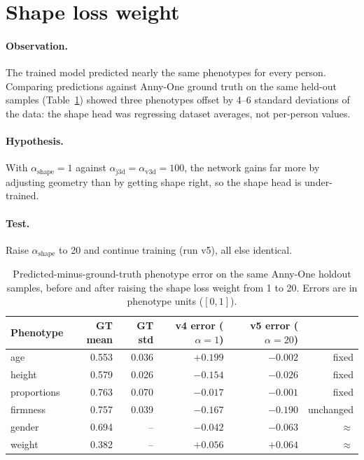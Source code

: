 \section{Shape loss weight}
\label{sec:shape_ablation}

\paragraph{Observation.} The trained model predicted nearly the same phenotypes
for every person. Comparing predictions against Anny-One ground truth on the
same held-out samples (Table~\ref{tab:shape}) showed three phenotypes offset by
4--6 standard deviations of the data: the shape head was regressing dataset
averages, not per-person values.

\paragraph{Hypothesis.} With $\alpha_{\text{shape}}{=}1$ against
$\alpha_{\text{j3d}}{=}\alpha_{\text{v3d}}{=}100$, the network gains far more by
adjusting geometry than by getting shape right, so the shape head is
under-trained.

\paragraph{Test.} Raise $\alpha_{\text{shape}}$ to 20 and continue training
(run v5), all else identical.

\begin{table}[h]
\centering\small
\begin{tabular}{lrrrrr}
\toprule
Phenotype & GT mean & GT std & v4 error ($\alpha{=}1$) & v5 error ($\alpha{=}20$) & \\
\midrule
age          & 0.553 & 0.036 & $+0.199$ & $\mathbf{-0.002}$ & fixed \\
height       & 0.579 & 0.026 & $-0.154$ & $\mathbf{-0.026}$ & fixed \\
proportions  & 0.763 & 0.070 & $-0.017$ & $\mathbf{-0.001}$ & fixed \\
firmness     & 0.757 & 0.039 & $-0.167$ & $-0.190$ & unchanged \\
gender       & 0.694 & --    & $-0.042$ & $-0.063$ & $\approx$ \\
weight       & 0.382 & --    & $+0.056$ & $+0.064$ & $\approx$ \\
\bottomrule
\end{tabular}
\caption{Predicted-minus-ground-truth phenotype error on the same Anny-One
holdout samples, before and after raising the shape loss weight from 1 to 20.
Errors are in phenotype units ($[0,1]$).}
\label{tab:shape}
\end{table}

